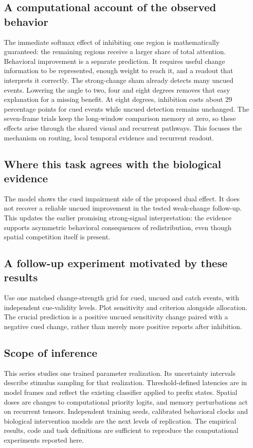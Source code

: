 \documentclass[11pt]{article}
\begin{document}
\subsection{A computational account of the observed behavior}
The immediate softmax effect of inhibiting one region is mathematically guaranteed: the remaining regions receive a larger share of total attention. Behavioral improvement is a separate prediction. It requires useful change information to be represented, enough weight to reach it, and a readout that interprets it correctly. The strong-change sham already detects many uncued events. Lowering the angle to two, four and eight degrees removes that easy explanation for a missing benefit. At eight degrees, inhibition costs about 29 percentage points for cued events while uncued detection remains unchanged. The seven-frame trials keep the long-window comparison memory at zero, so these effects arise through the shared visual and recurrent pathways. This focuses the mechanism on routing, local temporal evidence and recurrent readout.

\subsection{Where this task agrees with the biological evidence}
The model shows the cued impairment side of the proposed dual effect. It does not recover a reliable uncued improvement in the tested weak-change follow-up. This updates the earlier promising strong-signal interpretation: the evidence supports asymmetric behavioral consequences of redistribution, even though spatial competition itself is present.

\subsection{A follow-up experiment motivated by these results}
Use one matched change-strength grid for cued, uncued and catch events, with independent cue-validity levels. Plot sensitivity and criterion alongside allocation. The crucial prediction is a positive uncued sensitivity change paired with a negative cued change, rather than merely more positive reports after inhibition.
\subsection{Scope of inference}
This series studies one trained parameter realization. Its uncertainty intervals describe stimulus sampling for that realization. Threshold-defined latencies are in model frames and reflect the existing classifier applied to prefix states. Spatial doses are changes to computational priority logits, and memory perturbations act on recurrent tensors. Independent training seeds, calibrated behavioral clocks and biological intervention models are the next levels of replication. The empirical results, code and task definitions are sufficient to reproduce the computational experiments reported here.
\end{document}
